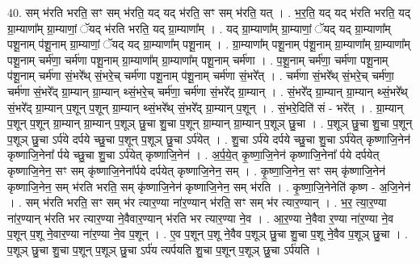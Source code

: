 \documentclass[17pt]{extarticle}
\begin{document}
40. सम् भ॑रति भरति॒ सꣳ सम् भ॑रति॒ यद् यद् भ॑रति॒ सꣳ सम् भ॑रति॒ यत् । . भ॒र॒ति॒ यद् यद् भ॑रति भरति॒ यद् ग्रा॒म्याणा᳚म् ग्रा॒म्याणां॒ ॅयद् भ॑रति भरति॒ यद् ग्रा॒म्याणा᳚म् । . यद् ग्रा॒म्याणा᳚म् ग्रा॒म्याणां॒ ॅयद् यद् ग्रा॒म्याणा᳚म् पशू॒नाम् प॑शू॒नाम् ग्रा॒म्याणां॒ ॅयद् यद् ग्रा॒म्याणा᳚म् पशू॒नाम् । . ग्रा॒म्याणा᳚म् पशू॒नाम् प॑शू॒नाम् ग्रा॒म्याणा᳚म् ग्रा॒म्याणा᳚म् पशू॒नाम् चर्म॑णा॒ चर्म॑णा पशू॒नाम् ग्रा॒म्याणा᳚म् ग्रा॒म्याणा᳚म् पशू॒नाम् चर्म॑णा । . प॒शू॒नाम् चर्म॑णा॒ चर्म॑णा पशू॒नाम् प॑शू॒नाम् चर्म॑णा सं॒भरे᳚थ् सं॒भरे॒च् चर्म॑णा पशू॒नाम् प॑शू॒नाम् चर्म॑णा सं॒भरे᳚त् । . चर्म॑णा सं॒भरे᳚थ् सं॒भरे॒च् चर्म॑णा॒ चर्म॑णा सं॒भरे᳚द् ग्रा॒म्यान् ग्रा॒म्यान् थ्सं॒भरे॒च् चर्म॑णा॒ चर्म॑णा सं॒भरे᳚द् ग्रा॒म्यान् । . सं॒भरे᳚द् ग्रा॒म्यान् ग्रा॒म्यान् थ्सं॒भरे᳚थ् सं॒भरे᳚द् ग्रा॒म्यान् प॒शून् प॒शून् ग्रा॒म्यान् थ्सं॒भरे᳚थ् सं॒भरे᳚द् ग्रा॒म्यान् प॒शून् । . सं॒भरे॒दिति॑ सं - भरे᳚त् । . ग्रा॒म्यान् प॒शून् प॒शून् ग्रा॒म्यान् ग्रा॒म्यान् प॒शूञ् छु॒चा शु॒चा प॒शून् ग्रा॒म्यान् ग्रा॒म्यान् प॒शूञ् छु॒चा । . प॒शूञ् छु॒चा शु॒चा प॒शून् प॒शूञ् छु॒चा ऽर्प॑ये दर्पये च्छु॒चा प॒शून् प॒शूञ् छु॒चा ऽर्प॑येत् । . शु॒चा ऽर्प॑ये दर्पये च्छु॒चा शु॒चा ऽर्प॑येत् कृष्णाजि॒नेन॑ कृष्णाजि॒नेना᳚ र्पये च्छु॒चा शु॒चा ऽर्प॑येत् कृष्णाजि॒नेन॑ । . अ॒र्प॒ये॒त् कृ॒ष्णा॒जि॒नेन॑ कृष्णाजि॒नेना᳚ र्पये दर्पयेत् कृष्णाजि॒नेन॒ सꣳ सम् कृ॑ष्णाजि॒नेना᳚र्पये दर्पयेत् कृष्णाजि॒नेन॒ सम् । . कृ॒ष्णा॒जि॒नेन॒ सꣳ सम् कृ॑ष्णाजि॒नेन॑ कृष्णाजि॒नेन॒ सम् भ॑रति भरति॒ सम् कृ॑ष्णाजि॒नेन॑ कृष्णाजि॒नेन॒ सम् भ॑रति । . कृ॒ष्णा॒जि॒नेनेति॑ कृष्ण - अ॒जि॒नेन॑ । . सम् भ॑रति भरति॒ सꣳ सम् भ॑र त्यार॒ण्या ना॑र॒ण्यान् भ॑रति॒ सꣳ सम् भ॑र त्यार॒ण्यान् । . भ॒र॒ त्या॒र॒ण्या ना॑र॒ण्यान् भ॑रति भर त्यार॒ण्या ने॒वैवार॒ण्यान् भ॑रति भर त्यार॒ण्या ने॒व । . आ॒र॒ण्या ने॒वैवा र॒ण्या ना॑र॒ण्या ने॒व प॒शून् प॒शू ने॒वार॒ण्या ना॑र॒ण्या ने॒व प॒शून् । . ए॒व प॒शून् प॒शू ने॒वैव प॒शूञ् छु॒चा शु॒चा प॒शू ने॒वैव प॒शूञ् छु॒चा । . प॒शूञ् छु॒चा शु॒चा प॒शून् प॒शूञ् छु॒चा ऽर्प॑य त्यर्पयति शु॒चा प॒शून् प॒शूञ् छु॒चा ऽर्प॑यति । \newline
\pagebreak
{}
\end{document}
